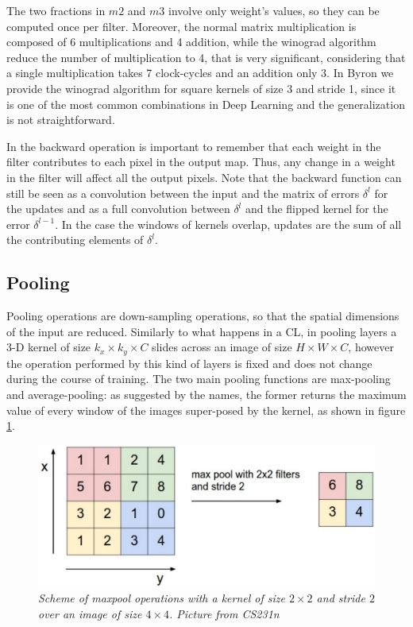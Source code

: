 \documentclass[12pt,a4paper]{report}
\begin{document}
The two fractions in $m2$ and $m3$ involve only weight's values, so they can be computed once per filter. Moreover, the normal matrix multiplication is composed of 6 multiplications and 4 addition, while the winograd algorithm reduce the number of multiplication to 4, that is very significant, considering that a  single multiplication takes 7 clock-cycles and an addition only 3. 
In Byron we provide the winograd algorithm for square kernels of size 3 and stride 1, since it is one of the most common combinations in Deep Learning and the generalization is not straightforward.

In the backward operation is important to remember that each weight in the filter contributes to each pixel in the output map. 
Thus, any change in a weight in the filter will affect all the output pixels. 
Note that the backward function can still be seen as a convolution between the input and the matrix of errors $\delta^l$ for the updates and as a full convolution between $\delta^l$ and the flipped kernel for the error $\delta^{l-1}$.
In the case the windows of kernels overlap, updates are the sum of all the contributing elements of $\delta^l$.

\subsection*{Pooling}

Pooling operations are down-sampling operations, so that the spatial dimensions of the input are reduced. Similarly to what happens in a CL, in pooling layers a 3-D kernel of size $k_x \times k_y \times C$ slides across an image of size $H \times W \times C$, however the operation performed by this kind of layers is fixed and does not change during the course of training.
The two main pooling functions are max-pooling and average-pooling: as suggested by the names, the former  
returns the maximum value of every window of the images super-posed by the kernel, as shown in figure \ref{fig:maxpool}.

\begin{figure}[h]
 \centering
 \includegraphics[scale=0.35]{./images/maxpool.png}
 \caption{\it Scheme of maxpool operations with a kernel of size $2 \times 2$ and stride $2$ over an image of size $4 \times 4$. Picture from CS231n}
 \label{fig:maxpool}
\end{figure}
\end{document}
